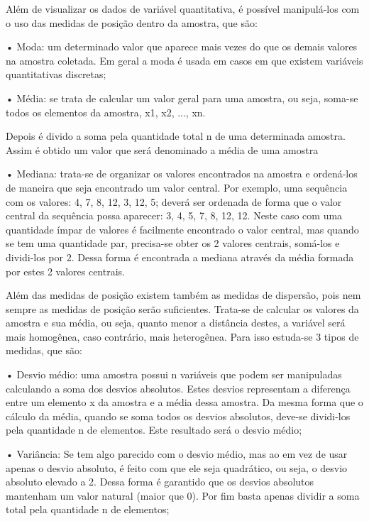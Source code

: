 \documentclass[
	12pt,				%
	openright,			%
	twoside,			%
	a4paper,			%
	english,			%
	french,				%
	spanish,			%
	brazil				%
	]{abntex2}
\begin{document}

Além de visualizar os dados de variável quantitativa, é possível manipulá-los com o uso das medidas de posição dentro da amostra, que são:

•	Moda: um determinado valor que aparece mais vezes do que os demais valores na amostra coletada. Em geral a moda é usada em casos em que existem variáveis quantitativas discretas;

•	Média: se trata de calcular um valor geral para uma amostra, ou seja, soma-se todos os elementos da amostra, x1, x2, ..., xn. 

Depois é divido a soma pela quantidade total n de uma determinada amostra. Assim é obtido um valor que será denominado a média de uma amostra

•	Mediana: trata-se de organizar os valores encontrados na amostra e ordená-los de maneira que seja encontrado um valor central. Por exemplo, uma sequência com os valores: 4, 7, 8, 12, 3, 12, 5; deverá ser ordenada de forma que o valor central da sequência possa aparecer: 3, 4, 5, 7, 8, 12, 12. Neste caso com uma quantidade ímpar de valores é facilmente encontrado o valor central, mas quando se tem uma quantidade par, precisa-se obter os 2 valores centrais, somá-los e dividi-los por 2. Dessa forma é encontrada a mediana através da média formada por estes 2 valores centrais.

Além das medidas de posição existem também as medidas de dispersão, pois nem sempre as medidas de posição serão suficientes. Trata-se de calcular os valores da amostra e sua média, ou seja, quanto menor a distância destes, a variável será mais homogênea, caso contrário, mais heterogênea. Para isso estuda-se 3 tipos de medidas, que são:

•	Desvio médio: uma amostra possui n variáveis que podem ser manipuladas calculando a soma dos desvios absolutos. Estes desvios representam a diferença entre um elemento x da amostra e a média dessa amostra. Da mesma forma que o cálculo da média, quando se soma todos os desvios absolutos, deve-se dividi-los pela quantidade n de elementos. Este resultado será o desvio médio;

•	Variância: Se tem algo parecido com o desvio médio, mas ao em vez de usar apenas o desvio absoluto, é feito com que ele seja quadrático, ou seja, o desvio absoluto elevado a 2. Dessa forma é garantido que os desvios absolutos mantenham um valor natural (maior que 0). Por fim basta apenas dividir a soma total pela quantidade n de elementos;
\end{document}
